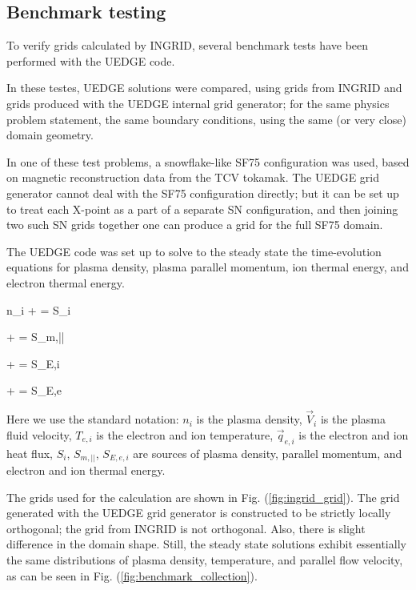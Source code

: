 \subsection{Benchmark testing}

To verify grids calculated by INGRID, several benchmark tests have
been performed with the UEDGE code.

In these testes, UEDGE solutions were compared, using grids from
INGRID and grids produced with the UEDGE internal grid generator; for
the same physics problem statement, the same boundary conditions,
using the same (or very close) domain geometry.

In one of these test problems, a snowflake-like SF75 configuration was
used, based on magnetic reconstruction data from the TCV tokamak. The
UEDGE grid generator cannot deal with the SF75 configuration directly;
but it can be set up to treat each X-point as a part of a separate SN
configuration, and then joining two such SN grids together one can
produce a grid for the full SF75 domain.

The UEDGE code was set up to solve to the steady state the
time-evolution equations for plasma density, plasma parallel momentum,
ion thermal energy, and electron thermal energy.


\beq
%
 n_i + \grad \cdot 
{}
= S_i \\
%
\eeq

\beq
{} \left[ M n_i {V}_{i,||} \right] + \grad \cdot
{}
= S_{m,||}
\eeq

\beq
{}
+
\grad \cdot
{} = S_{E,i}
%
\eeq

\beq
{}
+
\grad \cdot
{} = S_{E,e}
%
\eeq

Here we use the standard notation: $n_i$ is the plasma density,
$\vec{V}_i$ is the plasma fluid velocity, $T_{e,i}$ is the electron
and ion temperature, $\vec{q}_{e,i}$ is the electron and ion heat
flux, $S_i$, $S_{m,||}$, $S_{E,e,i}$ are sources of plasma density,
parallel momentum, and electron and ion thermal energy.

The grids used for the calculation are shown in Fig. (\ref{fig:ingrid_grid}). The
grid generated with the UEDGE grid generator is constructed to be
strictly locally orthogonal; the grid from INGRID is not
orthogonal. Also, there is slight difference in the domain
shape. Still, the steady state solutions exhibit essentially the same
distributions of plasma density, temperature, and parallel flow
velocity, as can be seen in Fig. (\ref{fig:benchmark_collection}).
